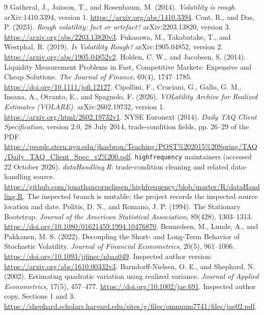 \begin{thebibliography}{9}
 Gatheral, J., Jaisson, T., and Rosenbaum, M. (2014). \emph{Volatility is rough}. arXiv:1410.3394, version 1. \url{https://arxiv.org/abs/1410.3394}.
 Cont, R., and Das, P. (2023). \emph{Rough volatility: fact or artefact?} arXiv:2203.13820, version 3. \url{https://arxiv.org/abs/2203.13820v3}.
 Fukasawa, M., Takabatake, T., and Westphal, R. (2019). \emph{Is Volatility Rough?} arXiv:1905.04852, version 2. \url{https://arxiv.org/abs/1905.04852v2}.
 Holden, C. W., and Jacobsen, S. (2014). Liquidity Measurement Problems in Fast, Competitive Markets: Expensive and Cheap Solutions. \emph{The Journal of Finance}, 69(4), 1747--1785. \url{https://doi.org/10.1111/jofi.12127}.
 Cipollini, F., Cruciani, G., Gallo, G. M., Insana, A., Otranto, E., and Spagnolo, F. (2026). \emph{VOLatility Archive for Realized Estimates (VOLARE)}. arXiv:2602.19732, version 1. \url{https://arxiv.org/html/2602.19732v1}.
 NYSE Euronext (2014). \emph{Daily TAQ Client Specification}, version 2.0, 28 July 2014, trade-condition fields, pp. 26--29 of the PDF. \url{https://people.stern.nyu.edu/jhasbrou/Teaching/POST%202015%20Spring/TAQ/Daily_TAQ_Client_Spec_v2%200.pdf}.
 \texttt{highfrequency} maintainers (accessed 22 October 2026). \emph{dataHandling.R}: trade-condition cleaning and related data-handling source. \url{https://github.com/jonathancornelissen/highfrequency/blob/master/R/dataHandling.R}. The inspected branch is mutable; the project records the inspected source location and date.
 Politis, D. N., and Romano, J. P. (1994). The Stationary Bootstrap. \emph{Journal of the American Statistical Association}, 89(428), 1303--1313. \url{https://doi.org/10.1080/01621459.1994.10476870}.
 Bennedsen, M., Lunde, A., and Pakkanen, M. S. (2022). Decoupling the Short- and Long-Term Behavior of Stochastic Volatility. \emph{Journal of Financial Econometrics}, 20(5), 961--1006. \url{https://doi.org/10.1093/jjfinec/nbaa049}. Inspected author version: \url{https://arxiv.org/abs/1610.00332v3}.
 Barndorff-Nielsen, O. E., and Shephard, N. (2002). Estimating quadratic variation using realized variance. \emph{Journal of Applied Econometrics}, 17(5), 457--477. \url{https://doi.org/10.1002/jae.691}. Inspected author copy, Sections 1 and 3: \url{https://shephard.scholars.harvard.edu/sites/g/files/omnuum7741/files/jae02.pdf}.
\end{thebibliography}

